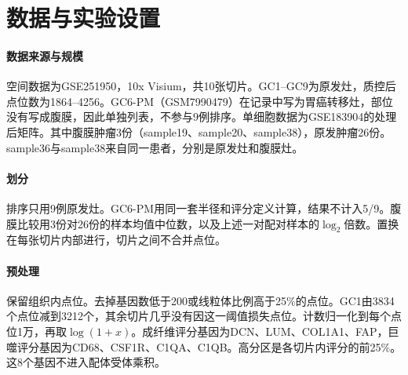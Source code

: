 \section{数据与实验设置}
\label{sec:data}

\paragraph{数据来源与规模}
空间数据为GSE251950，10x Visium，共10张切片\cite{gut2025}。GC1--GC9为原发灶，质控后点位数为1864--4256。GC6-PM（GSM7990479）在记录中写为胃癌转移灶，部位没有写成腹膜，因此单独列表，不参与9例排序。单细胞数据为GSE183904的处理后矩阵\cite{kumar2022}。其中腹膜肿瘤3份（sample19、sample20、sample38），原发肿瘤26份。sample36与sample38来自同一患者，分别是原发灶和腹膜灶。

\paragraph{划分}
排序只用9例原发灶。GC6-PM用同一套半径和评分定义计算，结果不计入5/9。腹膜比较用3份对26份的样本均值中位数，以及上述一对配对样本的$\log_2$倍数。置换在每张切片内部进行，切片之间不合并点位。

\paragraph{预处理}
保留组织内点位。去掉基因数低于200或线粒体比例高于25\%的点位。GC1由3834个点位减到3212个，其余切片几乎没有因这一阈值损失点位。计数归一化到每个点位1万，再取$\log(1+x)$。成纤维评分基因为DCN、LUM、COL1A1、FAP，巨噬评分基因为CD68、CSF1R、C1QA、C1QB。高分区是各切片内评分的前25\%。这8个基因不进入配体受体乘积。
